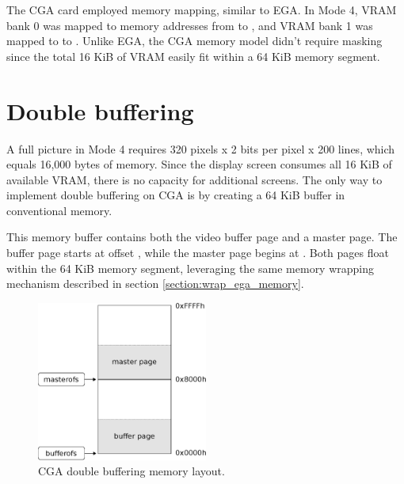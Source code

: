 \documentclass[book.tex]{subfiles}
\begin{document}
\par
The CGA card employed memory mapping, similar to EGA. In Mode 4, VRAM bank 0 was mapped to memory addresses from  to , and VRAM bank 1 was mapped to  to . Unlike EGA, the CGA memory model didn't require masking since the total 16 KiB of VRAM easily fit within a 64 KiB memory segment.



\section{Double buffering}
A full picture in Mode 4 requires 320 pixels x 2 bits per pixel x 200 lines, which equals 16,000 bytes of memory. Since the display screen consumes all 16 KiB of available VRAM, there is no capacity for additional screens. The only way to implement double buffering on CGA is by creating a 64 KiB buffer in conventional memory.\\

\par
\begin{minipage}{\textwidth}
  
\end{minipage}
\label{state_type}
\par
This memory buffer contains both the video buffer page and a master page. The buffer page starts at offset , while the master page begins at . Both pages float within the 64 KiB memory segment, leveraging the same memory wrapping mechanism described in section \ref{section:wrap_ega_memory}.\\

\begin{figure}[H]
\centering
\includegraphics[width=0.5\textwidth]{imgs/drawings/cga_screenseg.eps}
\caption{CGA double buffering memory layout.}
\label{fig:cga_screenseg}
\end{figure}
\end{document}
